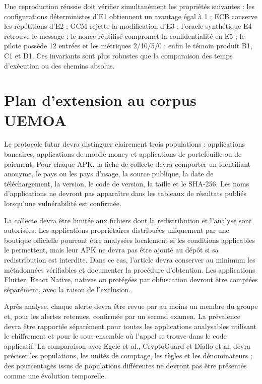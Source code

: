 \documentclass[conference,a4paper]{IEEEtran}
\begin{document}
Une reproduction réussie doit vérifier simultanément les propriétés suivantes : les configurations déterministes d'E1 obtiennent un avantage égal à 1 ; ECB conserve les répétitions d'E2 ; GCM rejette la modification d'E3 ; l'oracle synthétique E4 retrouve le message ; le nonce réutilisé compromet la confidentialité en E5 ; le pilote possède 12 entrées et les métriques 2/10/5/0 ; enfin le témoin produit B1, C1 et D1. Ces invariants sont plus robustes que la comparaison des temps d'exécution ou des chemins absolus.

\section{Plan d'extension au corpus UEMOA}

Le protocole futur devra distinguer clairement trois populations : applications bancaires, applications de mobile money et applications de portefeuille ou de paiement. Pour chaque APK, la fiche de collecte devra comporter un identifiant anonyme, le pays ou les pays d'usage, la source publique, la date de téléchargement, la version, le code de version, la taille et le SHA-256. Les noms d'applications ne devront pas apparaître dans les tableaux de résultats publiés lorsqu'une vulnérabilité est confirmée.

La collecte devra être limitée aux fichiers dont la redistribution et l'analyse sont autorisées. Les applications propriétaires distribuées uniquement par une boutique officielle pourront être analysées localement si les conditions applicables le permettent, mais leur APK ne devra pas être ajouté au dépôt si sa redistribution est interdite. Dans ce cas, l'article devra conserver au minimum les métadonnées vérifiables et documenter la procédure d'obtention. Les applications Flutter, React Native, natives ou protégées par obfuscation devront être comptées séparément, avec la raison de l'exclusion.

Après analyse, chaque alerte devra être revue par au moins un membre du groupe et, pour les alertes retenues, confirmée par un second examen. La prévalence devra être rapportée séparément pour toutes les applications analysables utilisant le chiffrement et pour le sous-ensemble où l'appel se trouve dans le code applicatif. La comparaison avec Egele et al., CryptoGuard et Diallo et al. devra préciser les populations, les unités de comptage, les règles et les dénominateurs ; des pourcentages issus de populations différentes ne devront pas être présentés comme une évolution temporelle.
\end{document}
